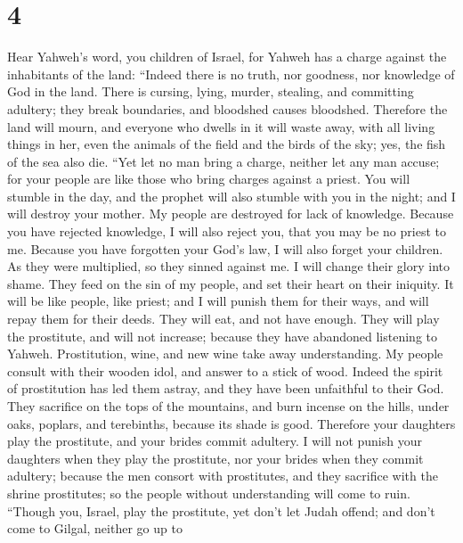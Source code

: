 \hypertarget{section-3}{%
\section{4}\label{section-3}}

 Hear Yahweh's word, you children of Israel, for Yahweh has
a charge against the inhabitants of the land: ``Indeed there is no
truth, nor goodness, nor knowledge of God in the land. 
There is cursing, lying, murder, stealing, and committing adultery; they
break boundaries, and bloodshed causes bloodshed.  Therefore
the land will mourn, and everyone who dwells in it will waste away, with
all living things in her, even the animals of the field and the birds of
the sky; yes, the fish of the sea also die.  ``Yet let no
man bring a charge, neither let any man accuse; for your people are like
those who bring charges against a priest.  You will stumble
in the day, and the prophet will also stumble with you in the night; and
I will destroy your mother.  My people are destroyed for
lack of knowledge. Because you have rejected knowledge, I will also
reject you, that you may be no priest to me. Because you have forgotten
your God's law, I will also forget your children.  As they
were multiplied, so they sinned against me. I will change their glory
into shame.  They feed on the sin of my people, and set
their heart on their iniquity.  It will be like people, like
priest; and I will punish them for their ways, and will repay them for
their deeds.  They will eat, and not have enough. They will
play the prostitute, and will not increase; because they have abandoned
listening to Yahweh.  Prostitution, wine, and new wine take
away understanding.  My people consult with their wooden
idol, and answer to a stick of wood. Indeed the spirit of prostitution
has led them astray, and they have been unfaithful to their God.
 They sacrifice on the tops of the mountains, and burn
incense on the hills, under oaks, poplars, and terebinths, because its
shade is good. Therefore your daughters play the prostitute, and your
brides commit adultery.  I will not punish your daughters
when they play the prostitute, nor your brides when they commit
adultery; because the men consort with prostitutes, and they sacrifice
with the shrine prostitutes; so the people without understanding will
come to ruin.  ``Though you, Israel, play the prostitute,
yet don't let Judah offend; and don't come to Gilgal, neither go up to
